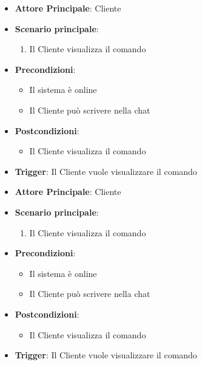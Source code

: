\label{uc_43.1.4}
\begin{itemize}
    \item \textbf{Attore Principale}: Cliente
	\item \textbf{Scenario principale}:
	\begin{enumerate}
		\item Il Cliente visualizza il comando 
	\end{enumerate}
	\item \textbf{Precondizioni}:
	\begin{itemize}
		\item Il sistema è online 
		\item Il Cliente può scrivere nella chat
	\end{itemize}
	\item \textbf{Postcondizioni}:
	\begin{itemize}
		\item Il Cliente visualizza il comando 
	\end{itemize}
	\item \textbf{Trigger}: Il Cliente vuole visualizzare il comando 
\end{itemize}

\label{uc_43.1.5}
\begin{itemize}
    \item \textbf{Attore Principale}: Cliente
	\item \textbf{Scenario principale}:
	\begin{enumerate}
		\item Il Cliente visualizza il comando 
	\end{enumerate}
	\item \textbf{Precondizioni}:
	\begin{itemize}
		\item Il sistema è online 
		\item Il Cliente può scrivere nella chat
	\end{itemize}
	\item \textbf{Postcondizioni}:
	\begin{itemize}
		\item Il Cliente visualizza il comando 
	\end{itemize}
	\item \textbf{Trigger}: Il Cliente vuole visualizzare il comando 
\end{itemize}

